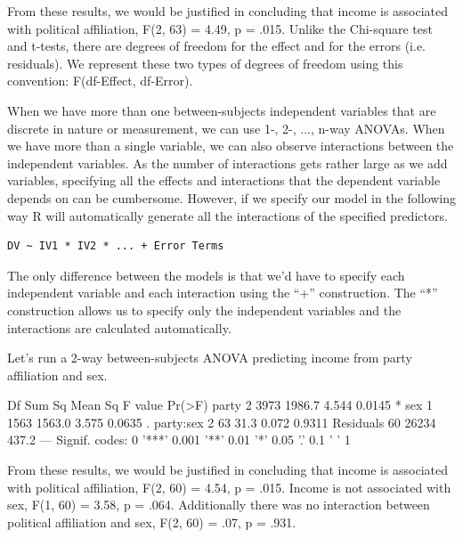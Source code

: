 \documentclass[12pt]{article}
\newcounter{subsubsubsection}[subsubsection]
\begin{document}
From these results, we would be justified in concluding that income is associated
with political affiliation, F(2, 63) = 4.49, p = .015. Unlike the Chi-square test
and t-tests, there are degrees of freedom for the effect and for the errors (i.e.
residuals). We represent these two types of degrees of freedom using this convention:
F(df-Effect, df-Error).

When we have more than one between-subjects independent variables that are discrete in
nature or measurement, we can use 1-, 2-, ..., n-way ANOVAs. When we have more
than a single variable, we can also observe interactions between the independent
variables. As the number of interactions gets rather large as we add variables,
specifying all the effects and interactions that the dependent variable depends on
can be cumbersome. However, if we specify our model in the following way R will
automatically generate all the interactions of the specified predictors.

\begin{verbatim}
DV ~ IV1 * IV2 * ... + Error Terms
\end{verbatim}

The only difference between the models is that we'd have to specify each independent variable and
each interaction using the ``+'' construction. The ``*'' construction allows us to
specify only the independent variables and the interactions are calculated automatically.

Let's run a 2-way between-subjects ANOVA predicting income from party affiliation and sex.

\begin{Schunk}
\begin{Soutput}
            Df Sum Sq Mean Sq F value Pr(>F)  
party        2   3973  1986.7   4.544 0.0145 *
sex          1   1563  1563.0   3.575 0.0635 .
party:sex    2     63    31.3   0.072 0.9311  
Residuals   60  26234   437.2                 
---
Signif. codes:  
0 '***' 0.001 '**' 0.01 '*' 0.05 '.' 0.1 ' ' 1
\end{Soutput}
\end{Schunk}

From these results, we would be justified in concluding that income is associated with
political affiliation, F(2, 60) = 4.54, p = .015. Income is not associated with sex, F(1, 60)
= 3.58, p = .064. Additionally there was no interaction between political affiliation and
sex, F(2, 60) = .07, p = .931.
\end{document}
